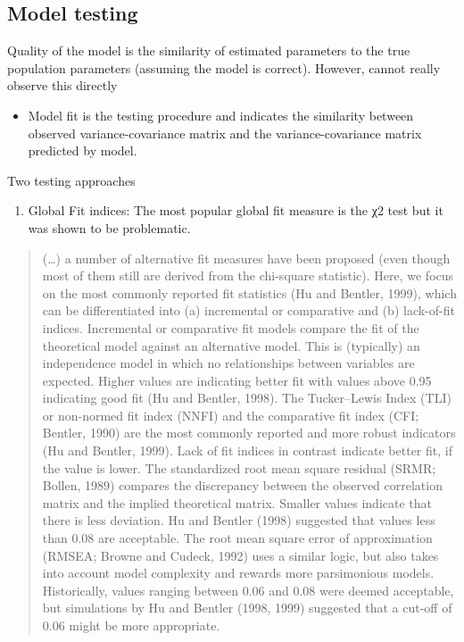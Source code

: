 \documentclass[
]{book}
\providecommand{\tightlist}{%
  \setlength{\itemsep}{0pt}\setlength{\parskip}{0pt}}
\begin{document}
\hypertarget{model-testing}{%
\subsection{Model testing}\label{model-testing}}

Quality of the model is the similarity of estimated parameters to the true population parameters (assuming the model is correct). However, cannot really observe this directly

\begin{itemize}
\tightlist
\item
  Model fit is the testing procedure and indicates the similarity between observed variance-covariance matrix and the variance-covariance matrix predicted by model.
\end{itemize}

Two testing approaches

\begin{enumerate}
\def\labelenumi{\arabic{enumi}.}
\tightlist
\item
  Global Fit indices: The most popular global fit measure is the χ2 test but it was shown to be problematic.
\end{enumerate}

\begin{quote}
(\ldots) a number of alternative fit measures have been proposed (even though most of them still are derived from the chi-square statistic). Here, we focus on the most commonly reported fit statistics (Hu and Bentler, 1999), which can be differentiated into (a) incremental or comparative and (b) lack-of-fit indices. Incremental or comparative fit models compare the fit of the theoretical model against an alternative model. This is (typically) an independence model in which no relationships between variables are expected. Higher values are indicating better fit with values above 0.95 indicating good fit (Hu and Bentler, 1998). The Tucker--Lewis Index (TLI) or non-normed fit index (NNFI) and the comparative fit index (CFI; Bentler, 1990) are the most commonly reported and more robust indicators (Hu and Bentler, 1999). Lack of fit indices in contrast indicate better fit, if the value is lower. The standardized root mean square residual (SRMR; Bollen, 1989) compares the discrepancy between the observed correlation matrix and the implied theoretical matrix. Smaller values indicate that there is less deviation. Hu and Bentler (1998) suggested that values less than 0.08 are acceptable. The root mean square error of approximation (RMSEA; Browne and Cudeck, 1992) uses a similar logic, but also takes into account model complexity and rewards more parsimonious models. Historically, values ranging between 0.06 and 0.08 were deemed acceptable, but simulations by Hu and Bentler (1998, 1999) suggested that a cut-off of 0.06 might be more appropriate. \citep{Fischer2019}
\end{quote}
\end{document}
